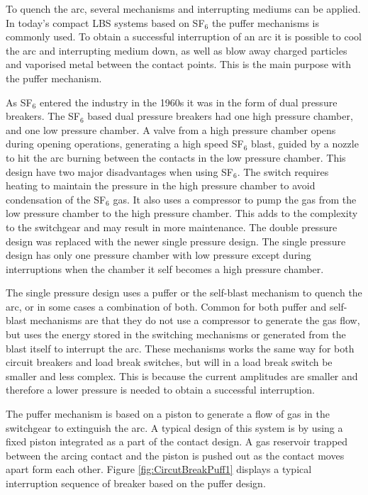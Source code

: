 \documentclass[10pt,a4paper]{article}
\begin{document}
To quench the arc, several mechanisms and interrupting mediums can be applied. In today's compact LBS systems based on SF$_6$ the puffer mechanisms is commonly used. To obtain a successful interruption of an arc it is possible to cool the arc and interrupting medium down, as well as blow away charged particles and vaporised metal between the contact points. This is the main purpose with the puffer mechanism. 

As SF$_6$ entered the industry in the 1960s it was in the form of dual pressure breakers. The SF$_6$ based dual pressure breakers had one high pressure chamber, and one low pressure chamber. A valve from a high pressure chamber opens during opening operations, generating a high speed SF$_6$ blast, guided by a nozzle to hit the arc burning between the contacts in the low pressure chamber. This design have two major disadvantages when using SF$_6$. The switch requires heating to maintain the pressure in the high pressure chamber to avoid condensation of the SF$_6$ gas. It also uses a compressor to pump the gas from the low pressure chamber to the high pressure chamber. This adds to the complexity to the switchgear and may result in more maintenance. The double pressure design was replaced with the newer single pressure design. The single pressure design has only one pressure chamber with low pressure except during interruptions when the chamber it self becomes a high pressure chamber.

The single pressure design uses a puffer or the self-blast mechanism to quench the arc, or in some cases a combination of both. Common for both puffer and self-blast mechanisms are that they do not use a compressor to generate the gas flow, but uses the energy stored in the switching mechanisms or generated from the blast itself to interrupt the arc. These mechanisms works the same way for both circuit breakers and load break switches, but will in a load break switch be smaller and less complex. This is because the current amplitudes are smaller and therefore a lower pressure is needed to obtain a successful interruption.

The puffer mechanism is based on a piston to generate a flow of gas in the switchgear to extinguish the arc. A typical design of this system is by using a fixed piston integrated as a part of the contact design. A gas reservoir trapped between the arcing contact and the piston is pushed out as the contact moves apart form each other. Figure \ref{fig:CircutBreakPuff1} displays a typical interruption sequence of breaker based on the puffer design.
\end{document}

